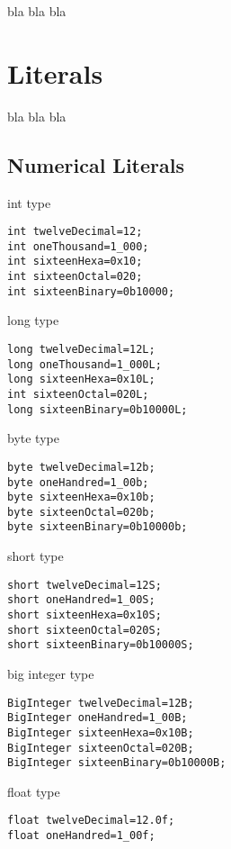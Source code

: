 \documentclass{tufte-book}
\begin{document}
            bla bla bla
            \section{Literals}
            bla bla bla
            \subsection{Numerical Literals}
int type            
\begin{lstlisting}
int twelveDecimal=12;
int oneThousand=1_000;
int sixteenHexa=0x10;
int sixteenOctal=020;
int sixteenBinary=0b10000;
\end{lstlisting}

            
long type            
\begin{lstlisting}
long twelveDecimal=12L;
long oneThousand=1_000L;
long sixteenHexa=0x10L;
int sixteenOctal=020L;
long sixteenBinary=0b10000L;
\end{lstlisting}

            
byte type            
\begin{lstlisting}
byte twelveDecimal=12b;
byte oneHandred=1_00b;
byte sixteenHexa=0x10b;
byte sixteenOctal=020b;
byte sixteenBinary=0b10000b;
\end{lstlisting}

            
short type            
\begin{lstlisting}
short twelveDecimal=12S;
short oneHandred=1_00S;
short sixteenHexa=0x10S;
short sixteenOctal=020S;
short sixteenBinary=0b10000S;
\end{lstlisting}
            
big integer type            
\begin{lstlisting}
BigInteger twelveDecimal=12B;
BigInteger oneHandred=1_00B;
BigInteger sixteenHexa=0x10B;
BigInteger sixteenOctal=020B;
BigInteger sixteenBinary=0b10000B;
\end{lstlisting}

float type            
\begin{lstlisting}
float twelveDecimal=12.0f;
float oneHandred=1_00f;
\end{lstlisting}
\end{document}
